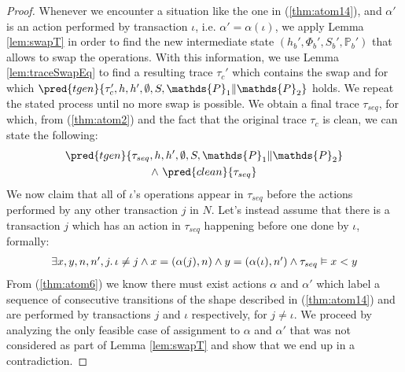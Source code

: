 \begin{thm}
{\begin{proof}
Whenever we encounter a situation like the one in (\ref{thm:atom14}), and $\alpha'$ is an action performed by transaction $\iota$, i.e. $\alpha' = \alpha(\iota)$, we apply Lemma \ref{lem:swapT} in order to find the new intermediate state $(h_b', \Phi_b', S_b', \mathds{P}_b')$ that allows to swap the operations. With this information, we use Lemma \ref{lem:traceSwapEq} to find a resulting trace $\tau_c'$ which contains the swap and for which $\pred{tgen}{\tau_c', h, h', \emptyset, S, \mathds{P}_1 \| \mathds{P}_2}$ holds. We repeat the stated process until no more swap is possible. We obtain a final trace $\tau_{seq}$, for which, from (\ref{thm:atom2}) and the fact that the original trace $\tau_c$ is clean, we can state the following:
\begin{gather}
	\label{thm:atom4} \pred{tgen}{\tau_{seq}, h, h', \emptyset, S, \mathds{P}_1 \| \mathds{P}_2} \\
		\land\
	\label{thm:atom7} \pred{clean}{\tau_{seq}}
\end{gather}
We now claim that all of $\iota$'s operations appear in $\tau_{seq}$ before the actions performed by any other transaction $j$ in $N$. Let's instead assume that there is a transaction $j$ which has an action in $\tau_{seq}$ happening before one done by $\iota$, formally:
\begin{gather}
	\label{thm:atom6}
	\begin{array}{c}
		\exists x, y, n, n', j \ldotp
		\iota \neq j
		\land x = (\alpha(j), n)
		\land y = (\alpha(\iota), n')
		\land \tau_{seq} \vDash x < y
	\end{array}
\end{gather}
From (\ref{thm:atom6}) we know there must exist actions $\alpha$ and $\alpha'$ which label a sequence of consecutive transitions of the shape described in (\ref{thm:atom14}) and are performed by transactions $j$ and $\iota$ respectively, for $j \neq \iota$. We proceed by analyzing the only feasible case of assignment to $\alpha$ and $\alpha'$ that was not considered as part of Lemma \ref{lem:swapT} and show that we end up in a contradiction.


\end{proof}}
\end{thm}
